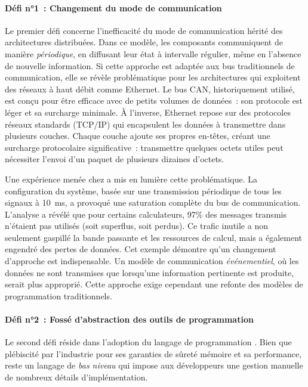 \paragraph{Défi n°1~: Changement du mode de communication}
Le premier défi concerne l'inefficacité du mode de communication hérité des architectures
distribuées. Dans ce modèle, les composants communiquent de manière \emph{périodique}, en diffusant
leur état à intervalle régulier, même en l'absence de nouvelle information. Si cette approche est
adaptée aux bus traditionnels de communication, elle se révèle problématique pour les architectures
\sdv qui exploitent des réseaux à haut débit comme Ethernet.
%
Le bus CAN, historiquement utilisé, est conçu pour être efficace avec de petits volumes de données~:
son protocole est léger et sa surcharge minimale. À l'inverse, Ethernet repose sur des protocoles
réseaux standards (TCP/IP) qui encapsulent les données à transmettre dans plusieurs couches. Chaque
couche ajoute ses propres en-têtes, créant une surcharge protocolaire significative~: transmettre
quelques octets utiles peut nécessiter l'envoi d'un paquet de plusieurs dizaines d'octets.

Une expérience menée chez \ampere a mis en lumière cette problématique. La configuration du système,
basée sur une transmission périodique de tous les signaux à 10~ms, a provoqué une saturation
complète du bus de communication. L'analyse a révélé que pour certains calculateurs, 97\% des
messages transmis n'étaient pas utilisés (soit superflus, soit perdus). Ce trafic inutile a non
seulement gaspillé la bande passante et les ressources de calcul, mais a également engendré des
pertes de données.
%
Cet exemple démontre qu'un changement d'approche est indispensable. Un modèle de communication
\emph{événementiel}, où les données ne sont transmises que lorsqu'une information pertinente est
produite, serait plus approprié. Cette approche exige cependant une refonte des modèles de
programmation traditionnels.

\paragraph{Défi n°2~: Fossé d'abstraction des outils de programmation}
Le second défi réside dans l'adoption du langage de programmation \Rust. Bien que plébiscité par
l'industrie pour ses garanties de sûreté mémoire et sa performance, \Rust reste un langage de
\emph{bas niveau} qui impose aux développeurs une gestion manuelle de nombreux détails
d'implémentation.

